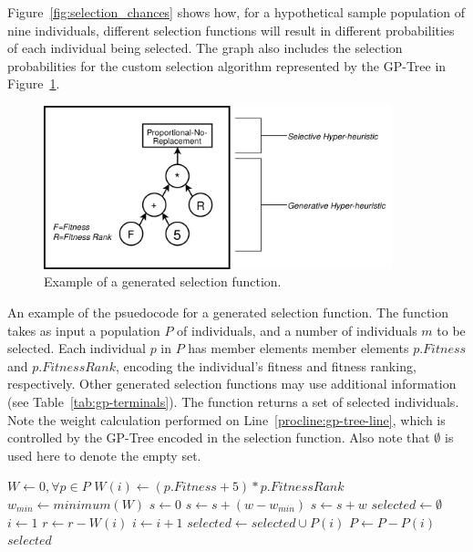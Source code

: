 \documentclass[times,12pt,titlepage]{mstogs}
\begin{document}
\begin{ThesisBody}
Figure~\ref{fig:selection_chances} shows how, for a hypothetical sample population of nine individuals, different selection functions will result in different probabilities of each individual being selected. The graph also includes the selection probabilities for the custom selection algorithm represented by the GP-Tree in Figure~\ref{fig:example_adpsea}. 

\begin{figure}
    \centering
    \includegraphics[width=0.9\textwidth]{example_eppsea}
    \caption{Example of a generated selection function.}
    \label{fig:example_adpsea}
\end{figure}

\begin{algorithm}
\caption{An example of the psuedocode for a generated selection function. The function takes as input a population $P$ of individuals, and a number of individuals $m$ to be selected. Each individual $p$ in $P$ has member elements member elements $p.Fitness$ and $p.FitnessRank$, encoding the individual's fitness and fitness ranking, respectively. Other generated selection functions may use additional information (see Table~\ref{tab:gp-terminals}).  The function returns a set of selected individuals. Note the weight calculation performed on Line~\ref{procline:gp-tree-line}, which is controlled by the GP-Tree encoded in the selection function. Also note that $\emptyset$ is used here to denote the empty set.}
\label{alg:ExampleSelection}
\begin{algorithmic}[1]
\label{proc:ExampleSelection}
	\State $W \leftarrow 0,\forall p \in P$
		\State $W(i) \leftarrow (p.Fitness + 5)*p.FitnessRank$\label{procline:gp-tree-line}
	\EndFor
	\State $w_{min} \leftarrow minimum(W)$	
	\State $s \leftarrow 0$ 
			\State $s \leftarrow s + (w - w_{min} )$			
		\Else
			\State $s \leftarrow s + w$		
		\EndIf	
	\EndFor
	\State $selected \leftarrow \emptyset$
		\State $i \leftarrow 1$
			\State $r \leftarrow r - W(i)$
			\State $i \leftarrow i + 1$
		\EndWhile	
		\State $selected \leftarrow selected \cup P(i)$
		\State $P \leftarrow P - P(i)$
	\EndFor
	\State \Return $selected$
\EndFunction
\end{algorithmic}
\end{algorithm}


\end{ThesisBody}
\end{document}
